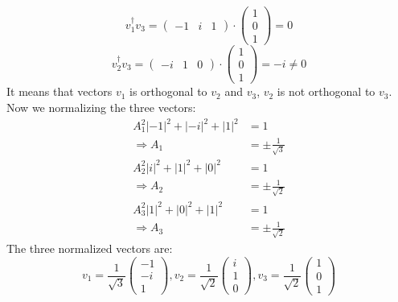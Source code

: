 \documentclass{article}
\begin{document}
\begin{equation*}
    v_1^\dagger v_3 =
    \begin{pmatrix}
        -1 & i & 1
    \end{pmatrix}
    \cdot
    \begin{pmatrix}
        1 \\
        0 \\
        1
    \end{pmatrix}
    =0
\end{equation*}
\begin{equation*}
    v_2^\dagger v_3 =
    \begin{pmatrix}
        -i & 1 & 0
    \end{pmatrix}
    \cdot
    \begin{pmatrix}
        1 \\
        0 \\
        1
    \end{pmatrix}
    = -i \neq 0
\end{equation*}
It means that vectors \(v_1\) is orthogonal to \(v_2\) and \(v_3\), \(v_2\) is not orthogonal to \(v_3\). Now we normalizing the three vectors:
\begin{align*}
    A_1^2|-1|^2 + |-i|^2 +|1|^2 &= 1 \\
    \Rightarrow A_1 &= \pm \frac{1}{\sqrt{3}} \\
    A_2^2|i|^2 + |1|^2 + |0|^2 &= 1 \\
    \Rightarrow A_2 &= \pm \frac{1}{\sqrt{2}} \\
    A_3^2|1|^2 + |0|^2 + |1|^2 &= 1 \\
    \Rightarrow A_3 &= \pm \frac{1}{\sqrt{2}}
\end{align*}
The three normalized vectors are:
\begin{equation*}
    v_1 = \frac{1}{\sqrt{3}}
    \begin{pmatrix}
        -1 \\
        -i \\
        1
    \end{pmatrix},
    v_2 = \frac{1}{\sqrt{2}}
    \begin{pmatrix}
        i \\
        1 \\
        0
    \end{pmatrix},
    v_3 = \frac{1}{\sqrt{2}}
    \begin{pmatrix}
        1 \\
        0 \\
        1
    \end{pmatrix}
\end{equation*}
\end{document}
